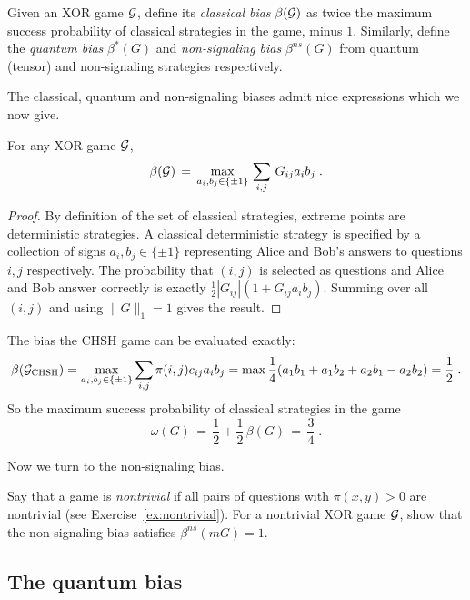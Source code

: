 \begin{definition}
Given an XOR game $\mathcal{G}$, define its \emph{classical bias} $\beta(\mathcal{G})$ as twice the maximum success probability of classical strategies in the game, minus $1$. Similarly, define the \emph{quantum bias} $\beta^*(G)$ and \emph{non-signaling bias} $\beta^{ns}(G)$ from quantum (tensor) and non-signaling strategies respectively.
\end{definition}

The classical, quantum and non-signaling biases admit nice expressions which we now give. 

\begin{lemma}
For any XOR game $\mathcal{G}$, 
 \begin{equation}\label{eq:bias-class}
 \beta(\mathcal{G}) \,=\, \max_{a_i,b_j\in\{\pm 1\}}\,\sum_{i,j}\, G_{ij}a_ib_j \;.
 \end{equation}
\end{lemma}

\begin{proof}
By definition of the set of classical strategies, extreme points are deterministic strategies. A classical deterministic strategy is specified by a collection of signs $a_i,b_j\in\{\pm 1\}$ representing Alice and Bob's answers to questions $i,j$ respectively. The probability that $(i,j)$ is selected as questions and Alice and Bob answer correctly is exactly $\frac{1}{2}|G_{ij}|(1+G_{ij}a_ib_j)$. Summing over all $(i,j)$ and using $\|G\|_1=1$ gives the result. 
\end{proof}

\begin{example}\label{ex:chsh-beta}
The bias the CHSH game can be evaluated exactly: 
 $$ \beta(\mathcal{G}_{\textsc{CHSH}})=\max_{a_i,b_j\in\{\pm 1\}}\sum_{i,j}\pi(i,j)c_{ij}a_ib_j=\max\frac{1}{4}(a_1b_1+a_1b_2+a_2b_1-a_2b_2)= \frac{1}{2}\;.  $$
	So the maximum success probability of classical strategies in the game  
	$$\omega(G) \,=\, \frac{1}{2} + \frac{1}{2}\, \beta(G) \,=\, \frac{3}{4}\;.$$
\end{example}

Now we turn to the non-signaling bias. 

\begin{exercise}
Say that a game is \emph{nontrivial} if all pairs of questions with $\pi(x,y)>0$ are nontrivial (see Exercise~\ref{ex:nontrivial}). For a nontrivial XOR game $\mathcal{G}$, show that the non-signaling bias satisfies $\beta^{ns}(mG)=1$.
\end{exercise}

\subsection{The quantum bias}

